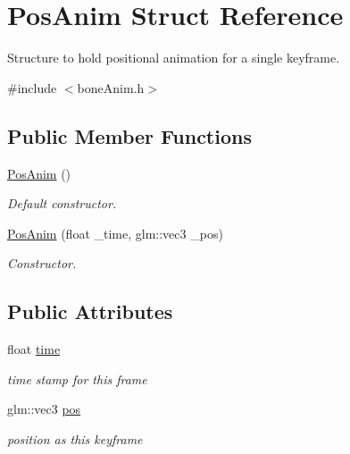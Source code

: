 \hypertarget{structPosAnim}{}\section{Pos\+Anim Struct Reference}
\label{structPosAnim}


Structure to hold positional animation for a single keyframe.  




{\ttfamily \#include $<$bone\+Anim.\+h$>$}

\subsection*{Public Member Functions}
\begin{DoxyCompactItemize}
\item 
\hyperlink{structPosAnim_a294e92d5208aa61661c123109f822bbb}{Pos\+Anim} ()\hypertarget{structPosAnim_a294e92d5208aa61661c123109f822bbb}{}\label{structPosAnim_a294e92d5208aa61661c123109f822bbb}

\begin{DoxyCompactList}\small\item\em Default constructor. \end{DoxyCompactList}\item 
\hyperlink{structPosAnim_aaa17581a5d8325a67ff24a78e5dfa0da}{Pos\+Anim} (float \+\_\+time, glm\+::vec3 \+\_\+pos)\hypertarget{structPosAnim_aaa17581a5d8325a67ff24a78e5dfa0da}{}\label{structPosAnim_aaa17581a5d8325a67ff24a78e5dfa0da}

\begin{DoxyCompactList}\small\item\em Constructor. \end{DoxyCompactList}\end{DoxyCompactItemize}
\subsection*{Public Attributes}
\begin{DoxyCompactItemize}
\item 
float \hyperlink{structPosAnim_aa517806845c157c382edda06ccbf76dd}{time}\hypertarget{structPosAnim_aa517806845c157c382edda06ccbf76dd}{}\label{structPosAnim_aa517806845c157c382edda06ccbf76dd}

\begin{DoxyCompactList}\small\item\em time stamp for this frame \end{DoxyCompactList}\item 
glm\+::vec3 \hyperlink{structPosAnim_af14f800ccd2679f90ef008ec50dacf77}{pos}\hypertarget{structPosAnim_af14f800ccd2679f90ef008ec50dacf77}{}\label{structPosAnim_af14f800ccd2679f90ef008ec50dacf77}

\begin{DoxyCompactList}\small\item\em position as this keyframe \end{DoxyCompactList}\end{DoxyCompactItemize}


